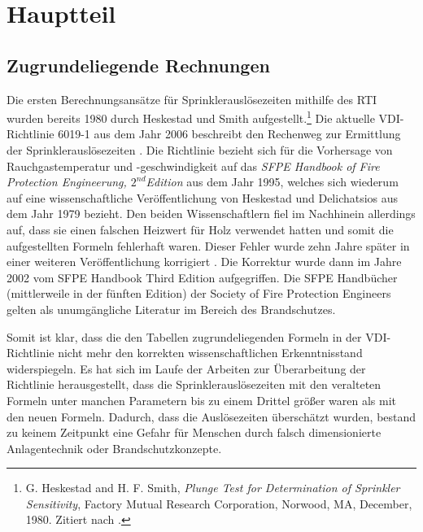 \chapter{Hauptteil}
\label{cha:Hauptteil}

\section{Zugrundeliegende Rechnungen}
\label{sec:zugrundeliegende}

Die ersten Berechnungsansätze für Sprinklerauslösezeiten mithilfe des RTI wurden bereits 1980 durch Heskestad und Smith aufgestellt.\footnote{G. Heskestad and H. F. Smith, \emph{Plunge Test for
Determination of Sprinkler Sensitivity}, Factory Mutual Research Corporation, Norwood, MA, December, 1980. Zitiert nach \cite{Heskestad1988}.}
Die aktuelle VDI-Richtlinie 6019-1 aus dem Jahr 2006 beschreibt den Rechenweg zur Ermittlung der Sprinklerauslösezeiten \cite{VDI6019B1}.
Die Richtlinie bezieht sich für die Vorhersage von Rauchgastemperatur und -geschwindigkeit auf das \emph{SFPE Handbook of Fire Protection Engineerung, $2^{nd}$Edition} aus dem Jahr 1995, welches sich wiederum auf eine wissenschaftliche Veröffentlichung von Heskestad und Delichatsios aus dem Jahr 1979 \cite{Heskestad1979} bezieht. Den beiden Wissenschaftlern fiel im Nachhinein allerdings auf, dass sie einen falschen Heizwert für Holz verwendet hatten und somit die aufgestellten Formeln fehlerhaft waren. Dieser Fehler wurde zehn Jahre später in einer weiteren Veröffentlichung korrigiert \cite{Heskestad1989}. Die Korrektur wurde dann im Jahre 2002 vom SFPE Handbook Third Edition \cite{SFPE3rd} aufgegriffen. 
Die SFPE Handbücher (mittlerweile in der fünften Edition) der Society of Fire Protection Engineers gelten als unumgängliche Literatur im Bereich des Brandschutzes. 

Somit ist klar, dass die den Tabellen zugrundeliegenden Formeln in der VDI-Richtlinie nicht mehr den korrekten wissenschaftlichen Erkenntnisstand widerspiegeln. Es hat sich im Laufe der Arbeiten zur Überarbeitung der Richtlinie herausgestellt, dass die Sprinklerauslösezeiten mit den veralteten Formeln unter manchen Parametern bis zu einem Drittel größer waren als mit den neuen Formeln. Dadurch, dass die Auslösezeiten überschätzt wurden, bestand zu keinem Zeitpunkt eine Gefahr für Menschen durch falsch dimensionierte Anlagentechnik oder Brandschutzkonzepte.

